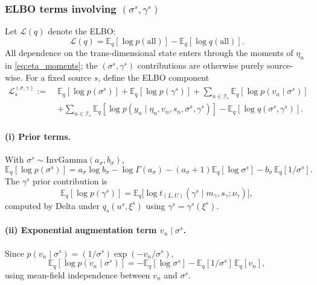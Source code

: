 \documentclass[11pt]{article}
\newcommand{\1}{\mathbb{I}}
\newcommand{\IG}{\mathrm{InvGamma}}
\newcommand{\E}{\mathbb{E}}
\begin{document}
\subsubsection*{ELBO terms involving $(\sigma^s,\gamma^s)$}

Let $\mathcal{L}(q)$ denote the ELBO:
\[
\mathcal{L}(q)=\E_q[\log p(\text{all})]-\E_q[\log q(\text{all})].
\]
All dependence on the trans-dimensional state enters through the moments of $\eta_n$ in \eqref{eq:eta_moments};
the $(\sigma^s,\gamma^s)$ contributions are otherwise purely source-wise. For a fixed source $s$, define the
	ELBO component
	\begin{equation}
	\begin{aligned}
	\mathcal{L}_s^{(\sigma,\gamma)} :=\;&
	\E_q[\log p(\sigma^s)] + \E_q[\log p(\gamma^s)]
	+ \sum_{n\in\mathcal{I}_s}\E_q[\log p(v_n\mid\sigma^s)]\\
	&+ \sum_{n\in\mathcal{I}_s}\E_q[\log p(y_n\mid \eta_n,v_n,s_n,\sigma^s,\gamma^s)]
	-\E_q[\log q(\sigma^s,\gamma^s)].
	\end{aligned}
	\label{eq:elbo_block_def}
	\end{equation}

\paragraph{(i) Prior terms.}
With $\sigma^s\sim \IG(a_\sigma,b_\sigma)$,
\begin{equation}
\E_q[\log p(\sigma^s)]
=
a_\sigma\log b_\sigma-\log\Gamma(a_\sigma)
-(a_\sigma+1)\E_q[\log\sigma^s]-b_\sigma\,\E_q[1/\sigma^s].
\label{eq:elbo_sigma_prior}
\end{equation}
The $\gamma^s$ prior contribution is
\begin{equation}
\E_q[\log p(\gamma^s)]
=\E_q\!\big[\log t_{(L,U)}(\gamma^s\mid m_\gamma,s_\gamma;\nu_\gamma)\big],
\label{eq:elbo_gamma_prior}
\end{equation}
computed by Delta under $q_s(u^s,\xi^s)$ using $\gamma^s=\gamma^s(\xi^s)$.

\paragraph{(ii) Exponential augmentation term $v_n\mid\sigma^s$.}
Since $p(v_n\mid\sigma^s)=(1/\sigma^s)\exp(-v_n/\sigma^s)$,
\begin{equation}
\E_q[\log p(v_n\mid\sigma^s)]
=-\E_q[\log\sigma^s]-\E_q[1/\sigma^s]\,\E_q[v_n],
\label{eq:elbo_v_given_sigma}
\end{equation}
using mean-field independence between $v_n$ and $\sigma^s$.
\end{document}
